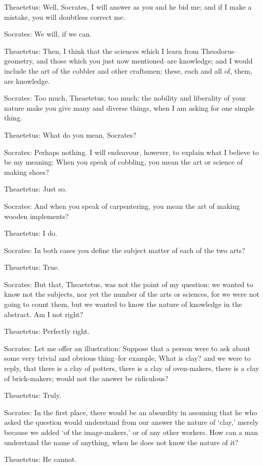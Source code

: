 Theaetetus: Well, Socrates, I will answer as you and he bid me; and if I
make a mistake, you will doubtless correct me.

Socrates: We will, if we can.

Theaetetus: Then, I think that the sciences which I learn from
Theodorus--geometry, and those which you just now mentioned--are
knowledge; and I would include the art of the cobbler and other
craftsmen; these, each and all of, them, are knowledge.

Socrates: Too much, Theaetetus, too much; the nobility and liberality of
your nature make you give many and diverse things, when I am asking for
one simple thing.

Theaetetus: What do you mean, Socrates?

Socrates: Perhaps nothing. I will endeavour, however, to explain what I
believe to be my meaning: When you speak of cobbling, you mean the art
or science of making shoes?

Theaetetus: Just so.

Socrates: And when you speak of carpentering, you mean the art of making
wooden implements?

Theaetetus: I do.

Socrates: In both cases you define the subject matter of each of the two
arts?

Theaetetus: True.

Socrates: But that, Theaetetus, was not the point of my question: we
wanted to know not the subjects, nor yet the number of the arts or
sciences, for we were not going to count them, but we wanted to know the
nature of knowledge in the abstract. Am I not right?

Theaetetus: Perfectly right.

Socrates: Let me offer an illustration: Suppose that a person were to
ask about some very trivial and obvious thing--for example, What is
clay? and we were to reply, that there is a clay of potters, there is
a clay of oven-makers, there is a clay of brick-makers; would not the
answer be ridiculous?

Theaetetus: Truly.

Socrates: In the first place, there would be an absurdity in assuming
that he who asked the question would understand from our answer the
nature of `clay,' merely because we added `of the image-makers,' or of
any other workers. How can a man understand the name of anything, when
he does not know the nature of it?

Theaetetus: He cannot.


